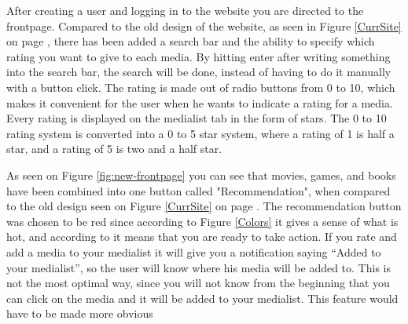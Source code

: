After creating a user and logging in to the website you are directed to the frontpage. Compared to the old design of the website, as seen in Figure \ref{CurrSite} on page \pageref{CurrSite}, there has been added a search bar and the ability to specify which rating you want to give to each media. By hitting enter after writing something into the search bar, the search will be done, instead of having to do it manually with a button click. The rating is made out of radio buttons from 0 to 10, which makes it convenient for the user when he wants to indicate a rating for a media. Every rating is displayed on the medialist tab in the form of stars. The 0 to 10 rating system is converted into a 0 to 5 star system, where a rating of 1 is half a star, and a rating of 5 is two and a half star.

As seen on Figure \ref{fig:new-frontpage} you can see that movies, games, and books have been combined into one button called "Recommendation", when compared to the old design seen on Figure \ref{CurrSite} on page \pageref{CurrSite}. The recommendation button was chosen to be red since according to Figure \ref{Colors} it gives a sense of what is hot, and according to \cite{EmpowerColor} it means that you are ready to take action. If you rate and add a media to your medialist it will give you a notification saying “Added to your medialist”, so the user will know where his media will be added to. This is not the most optimal way, since you will not know from the beginning that you can click on the media and it will be added to your medialist. This feature would have to be made more obvious

